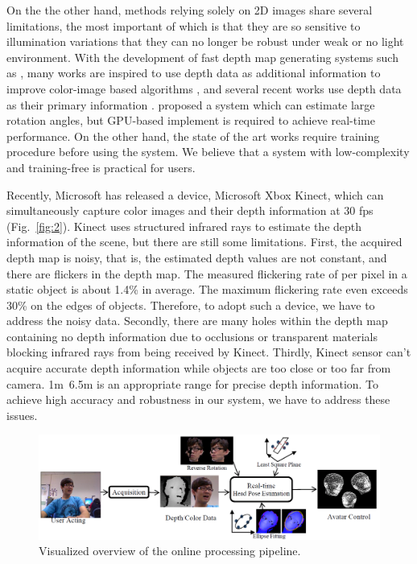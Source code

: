 On the the other hand, methods relying solely on 2D images share several limitations, the most important of which is that they are so sensitive to illumination variations that they can no longer be robust under weak or no light environment. With the development of fast depth map generating systems such as \cite{Ref12}, many works are inspired to use depth data as additional information to improve color-image based algorithms \cite{Ref1,Ref2,Ref20}, and several recent works use depth data as their primary information \cite{Ref3,Ref9,Ref16,Ref19}. \cite{Ref3} proposed a system which can estimate large rotation angles, but GPU-based implement is required to achieve real-time performance. On the other hand, the state of the art works \cite{Ref16,Ref19} require training procedure before using the system. We believe that a system with low-complexity and training-free is practical for users.

Recently, Microsoft has released a device, Microsoft Xbox Kinect, which can simultaneously capture color images and their depth information at 30 fps (Fig.~\ref{fig:2}). Kinect uses structured infrared rays to estimate the depth information of the scene, but there are still some limitations. First, the acquired depth map is noisy, that is, the estimated depth values are not constant, and there are flickers in the depth map. The measured flickering rate of per pixel in a static object is about 1.4\% in average. The maximum flickering rate even exceeds 30\% on the edges of objects. Therefore, to adopt such a device, we have to address the noisy data. Secondly, there are many holes within the depth map containing no depth information due to occlusions or transparent materials blocking infrared rays from being received by Kinect. Thirdly, Kinect sensor can’t acquire accurate depth information while objects are too close or too far from camera.  1m~6.5m is an appropriate range for precise depth information. To achieve high accuracy and robustness in our system, we have to address these issues.

\begin{figure}
\includegraphics[width=1.0\linewidth]{./fig3.png}
\caption{Visualized overview of the online processing pipeline.}
\label{fig:3}       %
\end{figure}

